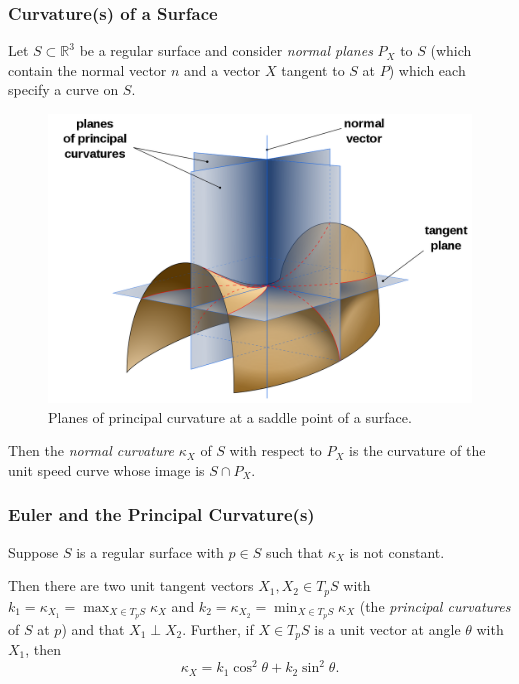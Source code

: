 \documentclass{beamer}
\newcommand{\R}{\mathbb{R}}
\theoremstyle{definition}
\begin{document}



\begin{frame}
    \frametitle{Curvature(s) of a Surface}

    Let $S \subset \R^3$ be a regular surface and consider \emph{normal planes}
    $P_X$ to $S$ (which contain the normal vector $n$ and a vector $X$ tangent to
    $S$ at $P$) which each specify a curve on $S$.

    \begin{figure}
        \centering
        \includegraphics[width=.4\textwidth]{images/planes-of-curvature.png}
        \caption{Planes of principal curvature at a saddle point of a surface.}
    \end{figure}

    Then the \emph{normal curvature} $\kappa_X$ of $S$ with respect to $P_X$
    is the curvature of the unit speed curve whose image is $S \cap P_X$.

\end{frame}

\begin{frame}
    \frametitle{Euler and the Principal Curvature(s)}

    \begin{theorem}[Euler, 1760]
        Suppose $S$ is a regular surface with $p \in S$ such that $\kappa_X$
        is not constant.

        Then there are two unit tangent vectors $X_1, X_2 \in T_pS$ with
        $k_1 = \kappa_{X_1} = \max_{X \in T_pS}\kappa_X$ and
        $k_2 = \kappa_{X_2} = \min_{X \in T_pS}\kappa_X$
        (the \emph{principal curvatures} of $S$ at $p$)
        and that $X_1 \perp X_2$. Further, if $X \in T_pS$ is a unit vector
        at angle $\theta$ with $X_1$, then
        \[
          \kappa_X = k_1\cos^2\theta + k_2\sin^2\theta.
        \]
    \end{theorem}

\end{frame}
\end{document}
